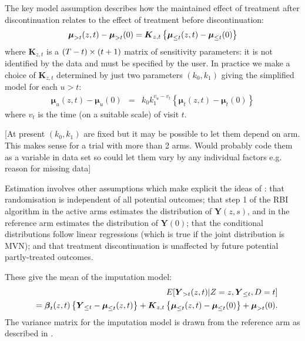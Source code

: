 The key model assumption describes how the maintained effect of treatment after
discontinuation relates to the effect of treatment before discontinuation:
\begin{equation}\label{eq:del}
\boldsymbol{\mu}_{{>t}}(z,t)-\boldsymbol{\mu}_{{>t}}(0) =
\boldsymbol{K}_{z,t} \left\{\boldsymbol{\mu}_{{\le{t}}}(z,t)-\boldsymbol{\mu}_{{\le{t}}}(0)\right\}
\end{equation}
where $\boldsymbol{K}_{z,t}$ is a $(T - t) \times (t+1)$ matrix of sensitivity parameters: it is not
identified by the data and must be specified by the user.
In practice we make a choice of $\boldsymbol{K}_{z,t}$ determined by just two parameters $(k_0,k_1)$ giving the simplified model for each $u>t$:
\begin{eqnarray}
\boldsymbol{\mu}_u(z,t) - \boldsymbol{\mu}_u(0)  & =& k_0 k_1^{v_u-v_t} \left\{ \boldsymbol{\mu}_t(z,t) - \boldsymbol{\mu}_t(0) \right\} \label{eq:mte3}
\end{eqnarray}
where  $v_t$ is the time (on a suitable scale) of visit $t$.

[At present $(k_0, k_1)$ are fixed but it may be possible to let them depend on arm. 
This makes sense for a trial with more than 2 arms. 
Would probably code them as a variable in data set so could let them vary by any individual factors e.g. reason for missing data]

Estimation involves other assumptions which make explicit the ideas of \citet{Carpenter++13}: 
that randomisation is independent of all potential outcomes; 
that step 1 of the RBI algorithm in the active arms estimates the distribution of $\boldsymbol{Y}(z,s)$,
and in the reference arm estimates the distribution of $\boldsymbol{Y}(0)$; 
that the conditional distributions follow linear regressions (which is true if the joint distribution is MVN); 
and that treatment discontinuation is unaffected by future potential partly-treated outcomes.

These give the mean of the imputation model:
\begin{eqnarray}\label{eq:causal}
&&E[\boldsymbol{Y}_{{>t}}(z,t) | Z=z, \boldsymbol{Y}_{{\le{t}}}, D=t]
\nonumber\\
&&=
\boldsymbol{\beta}_{t}(z,t) \left\{\boldsymbol{Y}_{{\le{t}}} - \boldsymbol{\mu}_{{\le{t}}}(z,t)\right\}  +
\boldsymbol{K}_{z,t} \left\{\boldsymbol{\mu}_{{\le{t}}}(z,t)-\boldsymbol{\mu}_{{\le{t}}}(0)\right\} +
\boldsymbol{\mu}_{{>t}}(0).
\end{eqnarray}
The variance matrix for the imputation model is drawn from the reference arm as described in \citet{ian:RBIcausal}.


